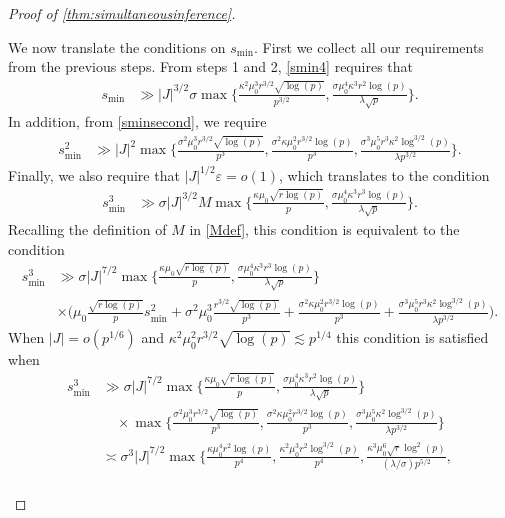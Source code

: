 \documentclass[10pt]{article}
\newcommand{\0}{{\mathbf{0}}}
\newcommand{\1}{{\mathbf{1}}}
\newcommand{\eps}{\varepsilon}
\begin{document}
\begin{proof}[Proof of \cref{thm:simultaneousinference}]
\begin{itemize}
We now translate the conditions on $s_{\min}$.   First we collect all our requirements from the previous steps.  From steps 1 and 2, \eqref{smin4} requires that
\begin{align*}
    s_{\min} &\gg  |J|^{3/2} \sigma \max\bigg\{ \frac{\kappa^2 \mu_0^3 r^{3/2} \sqrt{\log(p)}}{p^{3/2}}, \frac{\sigma \mu_0^4 \kappa^3 r^2 \log(p)}{\lambda \sqrt{p}} \bigg\}.
\end{align*}
In addition, from \eqref{sminsecond}, we require
\begin{align}
      s_{\min}^2 &\gg |J|^2 \max\bigg\{ \frac{\sigma^2 \mu_0^3 r^{3/2} \sqrt{\log(p)}}{p^3}, \frac{\sigma^2 \kappa \mu_0^2 r^{3/2} \log(p)}{p^3}, \frac{\sigma^3 \mu_0^5 r^3 \kappa^2 \log^{3/2}(p)}{\lambda p^{3/2}} \bigg\}. \label{sminsquared}
\end{align}
Finally, we also require that $|J|^{1/2} \eps = o(1)$, which translates to the condition
\begin{align*}
    s_{\min}^3 &\gg \sigma |J|^{3/2} M\max\bigg\{ \frac{ \kappa \mu_0 \sqrt{r\log(p)}}{p}, \frac{\sigma \mu_0^4 \kappa^3 r^3 \log(p)}{\lambda \sqrt{p}} \bigg\}. 
\end{align*}
Recalling the definition of $M$ in \eqref{Mdef}, this condition is equivalent to the condition
\begin{align*}
    s_{\min}^3 &\gg  \sigma |J|^{7/2}  \max\bigg\{ \frac{ \kappa \mu_0 \sqrt{r\log(p)}}{p}, \frac{\sigma \mu_0^4 \kappa^3 r^3 \log(p)}{\lambda \sqrt{p}} \bigg\} \\
    &\times \bigg( \mu_0 \frac{\sqrt{r \log(p)}}{p} s_{\min}^2 +  \sigma^2 \mu_0^3 \frac{ r^{3/2} \sqrt{\log(p)}}{p^3} \nonumber+  \frac{\sigma^2 \kappa \mu_0^2 r^{3/2} \log(p)}{p^3} 
     + \frac{\sigma^3 \mu_0^5 r^3 \kappa^2 \log^{3/2}(p)}{\lambda p^{3/2}} \bigg).
\end{align*}
When $|J| = o(p^{1/6})$ and $\kappa^2 \mu_0^2 r^{3/2} \sqrt{\log(p)} \lesssim p^{1/4}$ this condition is satisfied when
\begin{align*}
    s_{\min}^3 &\gg \sigma |J|^{7/2} \max\bigg\{ \frac{\kappa \mu_0 \sqrt{r\log(p)}}{p}, \frac{\sigma \mu_0^4 \kappa^3 r^2 \log(p)}{\lambda \sqrt{p}} \bigg\} \\
    &\quad \times \max\bigg\{ \frac{\sigma^2 \mu_0^3 r^{3/2} \sqrt{\log(p)}}{p^3}, \frac{\sigma^2 \kappa \mu_0^2 r^{3/2}\log(p)}{p^3}, \frac{\sigma^3 \mu_0^5 \kappa^2 \log^{3/2}(p)}{\lambda p^{3/2}} \bigg\} \\
    &\asymp \sigma^3 |J|^{7/2} \max\bigg\{ \frac{\kappa \mu_0^4 r^2 \log(p)}{p^4}, \frac{\kappa^2 \mu_0^3 r^2 \log^{3/2}(p)}{p^4}, \frac{\kappa^3 \mu_0^6 \sqrt{r} \log^2(p)}{ (\lambda/\sigma) p^{5/2}},\\

\end{align*}
\end{itemize}
\end{proof}
\end{document}
